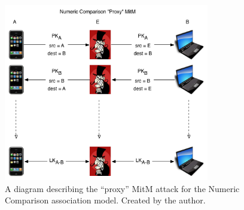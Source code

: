 \documentclass{acm_proc_article-sp}
\begin{document}
\begin{figure}
    \begin{center}
        \includegraphics[width=0.8\textwidth]{diagrams/nc_proxy_mitm.png}
        \caption{A diagram describing the ``proxy'' MitM attack for the Numeric Comparison association model. Created by the author.}
        \label{nc_proxy_mitm}
    \end{center}
\end{figure}

\balancecolumns
\end{document}
